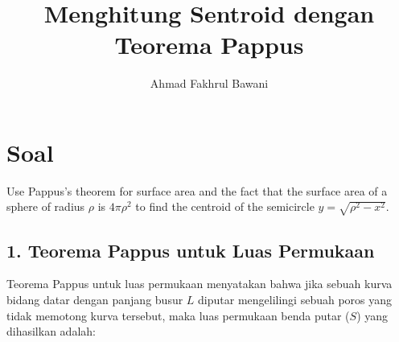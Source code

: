\documentclass[12pt,a4paper]{article}
\title{Menghitung Sentroid dengan Teorema Pappus}
\author{Ahmad Fakhrul Bawani}
\date{}
\begin{document}
\maketitle

\section*{Soal}

Use Pappus's theorem for surface area and the fact that the surface area of a sphere of radius $\rho$ is $4\pi\rho^2$ to find the centroid of the semicircle $y = \sqrt{\rho^2 - x^2}$.

\subsection*{1. Teorema Pappus untuk Luas Permukaan}
Teorema Pappus untuk luas permukaan menyatakan bahwa jika sebuah kurva bidang datar dengan panjang busur $L$ diputar mengelilingi sebuah poros yang tidak memotong kurva tersebut, maka luas permukaan benda putar ($S$) yang dihasilkan adalah:
\end{document}
